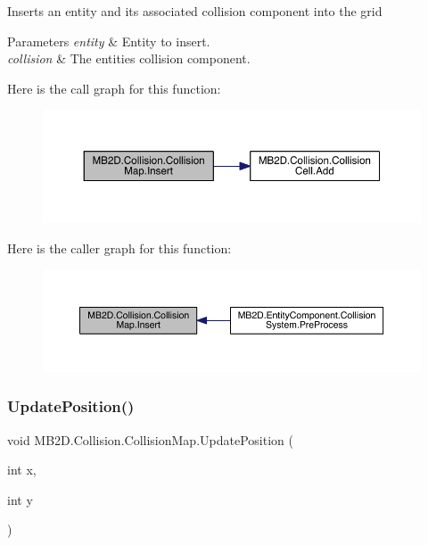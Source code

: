 Inserts an entity and its associated collision component into the grid 


\begin{DoxyParams}{Parameters}
{\em entity} & Entity to insert.\\
\hline
{\em collision} & The entities collision component.\\
\hline
\end{DoxyParams}
Here is the call graph for this function\+:\nopagebreak
\begin{figure}[H]
\begin{center}
\leavevmode
\includegraphics[width=350pt]{class_m_b2_d_1_1_collision_1_1_collision_map_a7d53571c049d50d62e6132413fe712e3_cgraph}
\end{center}
\end{figure}
Here is the caller graph for this function\+:\nopagebreak
\begin{figure}[H]
\begin{center}
\leavevmode
\includegraphics[width=350pt]{class_m_b2_d_1_1_collision_1_1_collision_map_a7d53571c049d50d62e6132413fe712e3_icgraph}
\end{center}
\end{figure}
\hypertarget{class_m_b2_d_1_1_collision_1_1_collision_map_a8f34c934947ce25d7de681fc07f14e09}{}\label{class_m_b2_d_1_1_collision_1_1_collision_map_a8f34c934947ce25d7de681fc07f14e09} 
\subsubsection{\texorpdfstring{Update\+Position()}{UpdatePosition()}}
{\footnotesize\ttfamily void M\+B2\+D.\+Collision.\+Collision\+Map.\+Update\+Position (\begin{DoxyParamCaption}\item[{int}]{x,  }\item[{int}]{y }\end{DoxyParamCaption})\hspace{0.3cm}{\ttfamily [inline]}}



